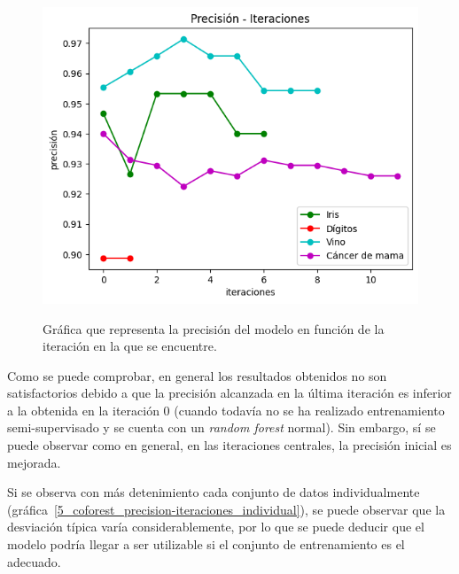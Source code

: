 \begin{figure}[h]
	\caption{Gráfica que representa la precisión del modelo en función de la iteración en la que se encuentre.}
	\centering
	\includegraphics[width=\textwidth]{../img/memoria/5_coforest_precision-iteraciones}
	\label{5_coforest_precision-iteraciones}
\end{figure}


Como se puede comprobar, en general los resultados obtenidos no son satisfactorios debido a que la precisión alcanzada en la última iteración es inferior a la obtenida en la iteración $0$ (cuando todavía no se ha realizado entrenamiento semi-supervisado y se cuenta con un \textit{random forest} normal). Sin embargo, sí se puede observar como en general, en las iteraciones centrales, la precisión inicial es mejorada.

Si se observa con más detenimiento cada conjunto de datos individualmente (gráfica~\ref{5_coforest_precision-iteraciones_individual}), se puede observar que la desviación típica varía considerablemente, por lo que se puede deducir que el modelo podría llegar a ser utilizable si el conjunto de entrenamiento es el adecuado.

